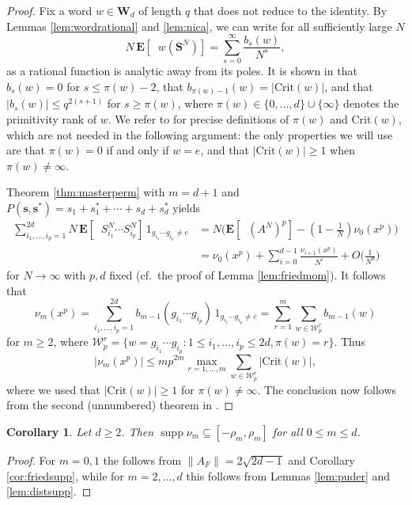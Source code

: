 \documentclass[10pt,reqno]{amsart}
\newtheorem{cor}[thm]{Corollary}
\theoremstyle{definition}
\theoremstyle{remark}
\numberwithin{equation}{section}
\numberwithin{figure}{section}
\numberwithin{table}{section}
\newcommand{\supp}{\mathop{\mathrm{supp}}}
\newcommand{\ntrN}{\mathop{\mathrm{tr}_N}}
\newcommand{\EE}{\mathbf{E}}
\begin{document}
\begin{proof}
Fix a word $w\in\mathbf{W}_d$ of length $q$ that does not reduce to the 
identity. By Lemmas \ref{lem:wordrational} and \ref{lem:nica}, we can write 
for all sufficiently large $N$
$$
	N\,\EE[\ntrN w(\boldsymbol{S}^N)] =
	\sum_{s=0}^\infty \frac{b_s(w)}{N^s},
$$
as a rational function is analytic away from its poles.
It is shown in \cite[\S 5.5]{Pud15} that
$b_s(w)=0$ for $s\le \pi(w)-2$, that 
$b_{\pi(w)-1}(w)=|\mathrm{Crit}(w)|$, and that $|b_s(w)|\le q^{2(s+1)}$
for $s\ge\pi(w)$, where $\pi(w)\in\{0,\ldots,d\}\cup\{\infty\}$ denotes
the primitivity rank of $w$. We refer to \cite[\S 2.2]{Pud15} for
precise definitions of $\pi(w)$ and $\mathrm{Crit}(w)$, which 
are not needed in the following argument: the only properties we 
will use are that $\pi(w)=0$ if and only if $w=e$, and that
$|\mathrm{Crit}(w)|\ge 1$ when $\pi(w)\ne\infty$.

Theorem \ref{thm:masterperm} with $m=d+1$ and
$P(\boldsymbol{s},\boldsymbol{s}^*) = s_1+s_1^*+\cdots+s_d+s_d^*$ yields
\begin{align*}
	\sum_{i_1,\ldots,i_p=1}^{2d}
	N\,\EE[\ntrN S^N_{i_1}\cdots S^N_{i_p}]
	\,1_{g_{i_1}\cdots g_{i_p}\ne e} &=
	N\big(\EE[\ntrN (A^N)^p] - (1-\tfrac{1}{N})\nu_0(x^p)\big)
	\\ &=
	\nu_0(x^p) +
	\sum_{i=0}^{d-1} \frac{\nu_{i+1}(x^p)}{N^i} +
	O\bigg(\frac{1}{N^d}\bigg)
\end{align*}
for $N\to\infty$ with $p,d$ fixed (cf.\ the proof of Lemma \ref{lem:friedmom}).
It follows that
$$
	\nu_{m}(x^p) = 
	\sum_{i_1,\ldots,i_p=1}^{2d}
	b_{m-1}(g_{i_1}\cdots g_{i_p})
	\,1_{g_{i_1}\cdots g_{i_p}\ne e} =
	\sum_{r=1}^m \sum_{w\in \mathcal{W}_p^r}
	b_{m-1}(w)
$$
for $m\ge 2$, where $\mathcal{W}_p^r =\{w=g_{i_1}\cdots
g_{i_p}: 1\le i_1,\ldots,i_p\le 2d,\pi(w)=r\}$. Thus
$$
	|\nu_m(x^p)| \le
	m p^{2m}
	\max_{r=1,\ldots,m}
	\sum_{w\in \mathcal{W}_p^r}
	|\mathrm{Crit}(w)|,
$$
where we used that $|\mathrm{Crit}(w)|\ge 1$ for $\pi(w)\ne\infty$.
The conclusion
now follows from the second (unnumbered)
theorem in \cite[\S 2.4]{Pud15}. 
\end{proof}


\begin{cor}
\label{cor:pudersupp}
Let $d\ge 2$.
Then $\supp\nu_m \subseteq [-\rho_m,\rho_m]$ for all $0\le m\le d$.
\end{cor}

\begin{proof}
For $m=0,1$ the follows from $\|A_F\|=2\sqrt{2d-1}$ and
Corollary \ref{cor:friedsupp}, while for $m=2,\ldots,d$ this 
follows from Lemmas \ref{lem:puder} and \ref{lem:distsupp}.
\end{proof}
\end{document}
